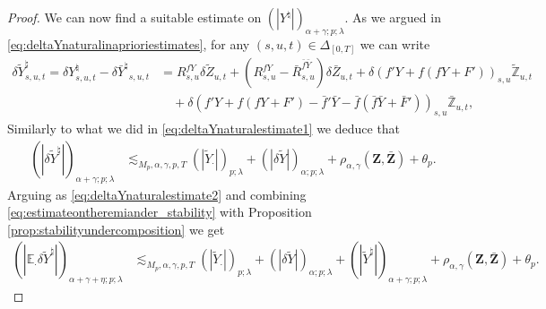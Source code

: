 \documentclass[11pt,a4paper]{article}
\newcommand{\E}{\mathbb{E}}
\theoremstyle{plain}
\begin{document}
\begin{proof}
We can now find a suitable estimate on $(|Y^\natural|)_{\alpha+\gamma;p;\lambda}$. As we argued in \eqref{eq:deltaYnaturalinaprioriestimates}, for any $(s,u,t) \in \Delta_{[0,T]}$ we can write  \begin{equation*}
    \begin{aligned}
        \delta \tilde{Y}^\natural_{s,u,t} = \delta{Y}^\natural_{s,u,t} - \delta{\bar{Y}^\natural}_{s,u,t} 
        &= R_{s,u}^{fY} \delta \tilde{Z}_{u,t}+ (R_{s,u}^{fY} -\bar{R}_{s,u}^{\bar{f} \bar{Y}})\delta \bar{Z}_{u,t} + \delta (f'Y + f(fY+F'))_{s,u} \tilde {\mathbb{Z}}_{u,t}  \\
        &\quad  + \delta (f'Y + f(fY+F') - \bar f'\bar Y - \bar f(\bar f\bar Y+\bar F'))_{s,u}\bar{\mathbb{Z}}_{u,t},
    \end{aligned}
\end{equation*} 
Similarly to what we did in \eqref{eq:deltaYnaturalestimate1} we deduce that 
\begin{align*}
    (|\delta \tilde{Y}^\natural|)_{\alpha+\gamma;p;\lambda} &\lesssim_{M_p,\alpha,\gamma,p,T} (|\tilde{Y}_\cdot|)_{p;\lambda} + (|\delta \tilde{Y}|)_{\alpha;p;\lambda} + \rho_{\alpha,\gamma}(\mathbf{Z},\bar{\mathbf{Z}}) + \theta_p .
\end{align*}
Arguing as \eqref{eq:deltaYnaturalestimate2} and combining \eqref{eq:estimateontheremiander_stability} with Proposition \ref{prop:stabilityundercomposition} we get \begin{align*}
    (|\E_\cdot \delta \tilde{Y}^\natural|)_{\alpha+\gamma+\eta;p;\lambda} &\lesssim_{M_p,\alpha,\gamma,p,T} (|\tilde{Y}_\cdot|)_{p;\lambda} + (|\delta \tilde{Y}|)_{\alpha;p;\lambda} + (|\tilde{Y}^\natural|)_{\alpha+\gamma;p;\lambda} + \rho_{\alpha,\gamma}(\mathbf{Z},\bar{\mathbf{Z}}) + \theta_p.
\end{align*}

\end{proof}
\end{document}

